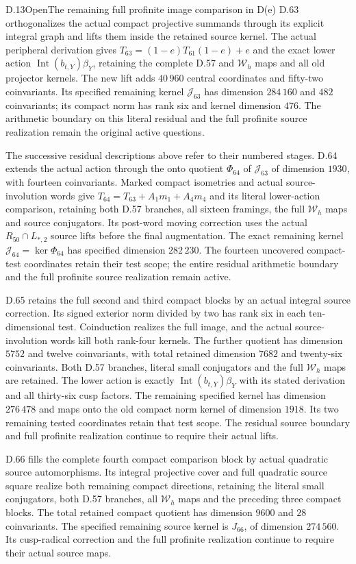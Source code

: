 \begin{statement}{D.13}{Open}{The remaining full profinite image comparison in D(e)}
D.63 orthogonalizes the actual compact projective summands
through its explicit integral graph and lifts them inside the
retained source kernel. The actual peripheral derivation gives
$T_{63}=(1-e)T_{61}(1-e)+e$ and the exact lower action
$\operatorname{Int}(b_{t,Y})\beta_Y$, retaining the complete
D.57 and $\mathcal W_h$ maps and all old projector kernels.
The new lift adds $40\,960$ central coordinates and fifty-two
coinvariants. Its specified remaining kernel $\mathcal J_{63}$
has dimension $284\,160$ and $482$ coinvariants; its compact
norm has rank six and kernel dimension $476$.
The arithmetic boundary on this literal residual and the
full profinite source realization remain the original active
questions.

The successive residual descriptions above refer to their
numbered stages. D.64 extends the actual action through the
onto quotient $\Phi_{64}$ of $\mathcal J_{63}$ of dimension
$1930$, with fourteen coinvariants. Marked compact isometries
and actual source-involution words give
$T_{64}=T_{63}+A_1m_1+A_4m_4$ and its literal lower-action
comparison, retaining both D.57 branches, all sixteen framings,
the full $\mathcal W_h$ maps and source conjugators.
Its post-word moving correction uses the actual
$R_{50}\cap L_{*,2}$ source lifts before the final augmentation.
The exact remaining kernel $\mathcal J_{64}=\ker\Phi_{64}$
has specified dimension $282\,230$.
The fourteen uncovered compact-test coordinates retain
their test scope; the entire residual arithmetic boundary
and the full profinite source realization remain active.

D.65 retains the full second and third compact blocks by an actual
integral source correction. Its signed exterior norm divided by two
has rank six in each ten-dimensional test. Coinduction realizes the
full image, and the actual source-involution words kill both rank-four
kernels. The further quotient has dimension $5752$ and twelve
coinvariants, with total retained dimension $7682$ and twenty-six
coinvariants. Both D.57 branches, literal small conjugators and the
full $\mathcal W_h$ maps are retained. The lower action is exactly
$\operatorname{Int}(b_{t,Y})\beta_Y$ with its stated derivation and
all thirty-six cusp factors. The remaining specified kernel has
dimension $276\,478$ and maps onto the old compact norm kernel of
dimension $1918$. Its two remaining tested coordinates retain that
test scope. The residual source boundary and full profinite
realization continue to require their actual lifts.

D.66 fills the complete fourth compact comparison block by actual
quadratic source automorphisms. Its integral projective cover and full
quadratic source square realize both remaining compact directions,
retaining the literal small conjugators, both D.57 branches, all
$\mathcal W_h$ maps and the preceding three compact blocks. The total
retained compact quotient has dimension $9600$ and $28$ coinvariants.
The specified remaining source kernel is $J_{66}$, of dimension
$274\,560$. Its cusp-radical correction and the full profinite
realization continue to require their actual source maps.
\end{statement}
